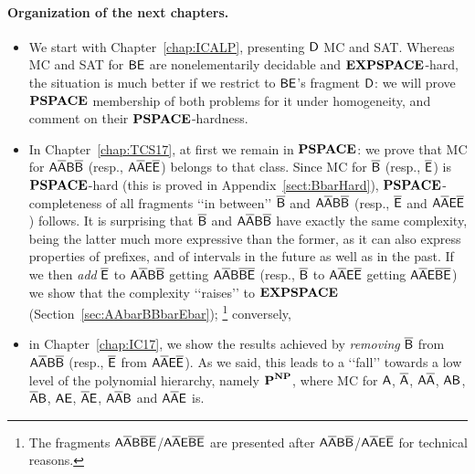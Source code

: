 \paragraph{Organization of the next chapters.}
\begin{itemize}
	\item  We start with Chapter~\ref{chap:ICALP}, presenting $\mathsf{D}$ MC and SAT. Whereas MC and SAT for $\mathsf{BE}$ are nonelementarily decidable and $\textbf{EXPSPACE}$-hard, the situation is much better if we restrict to $\mathsf{BE}$'s fragment $\mathsf{D}$: we will prove $\textbf{PSPACE}$ membership of both problems for it under homogeneity, and comment on their $\textbf{PSPACE}$-hardness.
	\item In Chapter~\ref{chap:TCS17}, at first we remain in $\textbf{PSPACE}$: we prove that MC for $\mathsf{A\overline{A}B\overline{B}}$ (resp., $\mathsf{A\overline{A}E\overline{E}}$) belongs to that class. Since MC for $\mathsf{\overline{B}}$ (resp., $\mathsf{\overline{E}}$) is $\textbf{PSPACE}$-hard (this is proved in Appendix~\ref{sect:BbarHard}), $\textbf{PSPACE}$-completeness of all fragments \lq\lq in between\rq\rq{} $\mathsf{\overline{B}}$ and $\mathsf{A\overline{A}B\overline{B}}$ (resp., $\mathsf{\overline{E}}$ and $\mathsf{A\overline{A}E\overline{E}}$) follows. It is surprising that $\mathsf{\overline{B}}$ and $\mathsf{A\overline{A}B\overline{B}}$ have exactly the same complexity, being the latter much more expressive than the former, as it can also express properties of prefixes, and of intervals in the future as well as in the past.
If we then \emph{add} $\mathsf{\overline{E}}$ to $\mathsf{A\overline{A}B\overline{B}}$ getting $\mathsf{A\overline{A}B\overline{B}\overline{E}}$ (resp., $\mathsf{\overline{B}}$ to $\mathsf{A\overline{A}E\overline{E}}$ getting $\mathsf{A\overline{A}E\overline{B}\overline{E}}$) we show that the complexity \lq\lq raises\rq\rq{} to $\textbf{EXPSPACE}$ (Section~\ref{sec:AAbarBBbarEbar});%
 \footnote{The fragments $\mathsf{A\overline{A}B\overline{B}\overline{E}}$/$\mathsf{A\overline{A}E\overline{B}\overline{E}}$ are presented after $\mathsf{A\overline{A}B\overline{B}}$/$\mathsf{A\overline{A}E\overline{E}}$ for technical reasons.} 
 conversely,  
 \item in Chapter~\ref{chap:IC17}, we show the results achieved by \emph{removing} $\mathsf{\overline{B}}$ from $\mathsf{A\overline{A}B\overline{B}}$  (resp., $\mathsf{\overline{E}}$ from $\mathsf{A\overline{A}E\overline{E}}$). As we said, this leads to a \lq\lq fall\rq\rq{} towards a low level of the polynomial hierarchy, namely $\textbf{P}^{\textbf{NP}}$, where MC for $\mathsf{A}$, $\mathsf{\overline{A}}$, $\mathsf{A\overline{A}}$, $\mathsf{AB}$, $\mathsf{\overline{A}B}$, $\mathsf{AE}$, $\mathsf{\overline{A}E}$, $\mathsf{A\overline{A}B}$ and  $\mathsf{A\overline{A}E}$ is.
\end{itemize}


